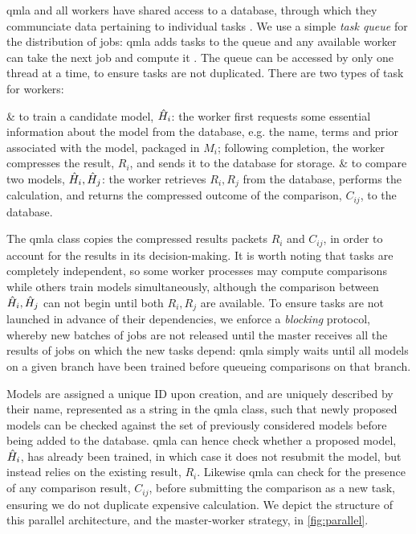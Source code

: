 \par 
\gls{qmla} and all workers have shared access to a database, through which they communciate data pertaining to individual tasks \cite{redis}. 
We use a simple \emph{task queue} for the distribution of jobs: 
    \gls{qmla} adds tasks to the queue and any available worker can take the next job and compute it \cite{redis_queue}.
The queue can be accessed by only one thread at a time, to ensure tasks are not duplicated. 
There are two types of task for workers:
\begin{easylist}
    & to train a candidate model, $\hat{H}_i$:
        the worker first requests some essential information about the model from the database, 
        e.g. the name, terms and prior associated with the model, packaged in $M_i$;
        following completion, the worker compresses the result, $R_i$, and sends it to the database for storage. 
    & to compare two models, $\hat{H}_i, \hat{H}_j$: 
        the worker retrieves $R_i, R_j$ from the database, performs the calculation, 
        and returns the compressed outcome of the comparison, $C_{ij}$, to the database. 
\end{easylist}
The \gls{qmla} class copies the compressed results packets $R_i$ and $C_{ij}$,
    in order to account for the results in its decision-making. 
It is worth noting that tasks are completely independent, so some worker processes
    may compute comparisons while others train models simultaneously, 
    although the comparison between $\hat{H}_i, \hat{H}_j$ can not begin until both $R_i, R_j$ are available. 
To ensure tasks are not launched in advance of their dependencies, we enforce a \emph{blocking} protocol, 
    whereby new batches of jobs are not released until the master receives all the results of jobs on which the new tasks depend:
    \gls{qmla} simply waits until all models on a given branch have been trained before queueing comparisons 
    on that branch.
\par

Models are assigned a unique ID upon creation,
    and are uniquely described by their name, represented as a string in the \gls{qmla} class, 
    such that newly proposed models can be checked against the set of previously considered models 
    before being added to the database. 
\gls{qmla} can hence check whether a proposed model, $\hat{H}_i$, has already been trained, 
    in which case it does not resubmit the model, but instead relies on the existing result, $R_i$. 
Likewise \gls{qmla} can check for the presence of any comparison result, $C_{ij}$, 
    before submitting the comparison as a new task, 
    ensuring we do not duplicate expensive calculation. 
We depict the structure of this parallel architecture, and the master-worker strategy, in \cref{fig:parallel}.

